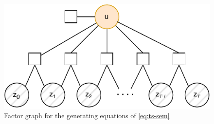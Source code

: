 \begin{figure}
    \centering
    \includegraphics{FG_ts.drawio.pdf}
    \caption{Factor graph  for the generating equations of \eqref{eq:ts-sem}}
    \label{fig:ts_fg}
\end{figure}
\fi

